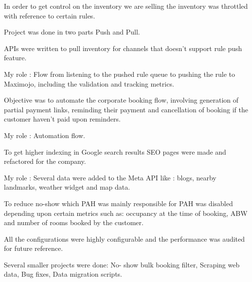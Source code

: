 \documentclass[]{deedy-resume-openfont}
\begin{document}
\begin{tightemize}
\item In order to get control on the inventory we are selling the inventory was throttled with reference to certain rules.
\item Project was done in two parts Push and Pull.
\item APIs were written to pull inventory for channels that doesn’t support rule push feature.
\item My role : Flow from listening to the pushed rule queue to pushing the rule to Maximojo, including the validation and tracking metrics.
\end{tightemize}
\begin{tightemize}
\item Objective was to automate the corporate booking flow, involving generation of partial payment links, reminding their payment and cancellation of booking if the customer haven’t paid upon reminders.
\item My role : Automation flow.
\end{tightemize}
\begin{tightemize}
\item To get higher indexing in Google search results SEO pages were made and refactored for the company.
\item My role : Several data were added to the Meta API like : blogs, nearby landmarks, weather widget and map data.
\end{tightemize}
\begin{tightemize}
\item To reduce no-show which PAH was mainly responsible for PAH was disabled depending upon certain metrics such as: occupancy at the time of booking, ABW and number of rooms booked by the customer.
\item All the configurations were highly configurable and the performance was audited for future reference.
\end{tightemize}
\begin{tightemize}
\item Several smaller projects were done: No- show bulk booking filter, Scraping web data, Bug fixes, Data migration scripts.
\end{tightemize}
\sectionsep
\end{document}
